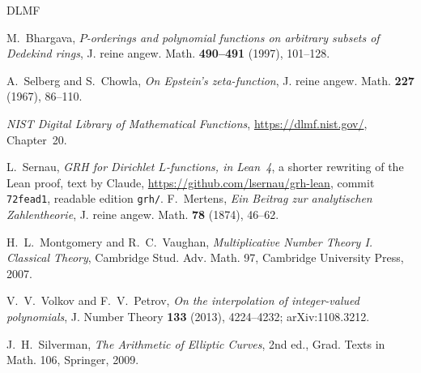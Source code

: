 \documentclass[reqno]{amsart}
\theoremstyle{definition}
\theoremstyle{plain}
\begin{document}
\begin{thebibliography}{DLMF}

M.~Bhargava, \emph{\(P\)-orderings and polynomial functions on arbitrary subsets of Dedekind rings}, J. reine angew. Math. \textbf{490--491} (1997), 101--128.

A.~Selberg and S.~Chowla, \emph{On Epstein's zeta-function}, J. reine angew. Math. \textbf{227} (1967), 86--110.

\emph{NIST Digital Library of Mathematical Functions}, \url{https://dlmf.nist.gov/}, Chapter~20.

 L.~Sernau, \emph{GRH for Dirichlet \(L\)-functions, in Lean~4}, a shorter rewriting of the Lean proof, text by Claude, \url{https://github.com/lsernau/grh-lean}, commit \texttt{72fead1}, readable edition \texttt{grh/}.
F.~Mertens, \emph{Ein Beitrag zur analytischen Zahlentheorie}, J. reine angew. Math. \textbf{78} (1874), 46--62.

H.~L.~Montgomery and R.~C.~Vaughan, \emph{Multiplicative Number Theory I. Classical Theory}, Cambridge Stud. Adv. Math. 97, Cambridge University Press, 2007.

V.~V.~Volkov and F.~V.~Petrov, \emph{On the interpolation of integer-valued polynomials}, J. Number Theory \textbf{133} (2013), 4224--4232; arXiv:1108.3212.

J.~H.~Silverman, \emph{The Arithmetic of Elliptic Curves}, 2nd ed., Grad. Texts in Math. 106, Springer, 2009.

\end{thebibliography}
\end{document}
